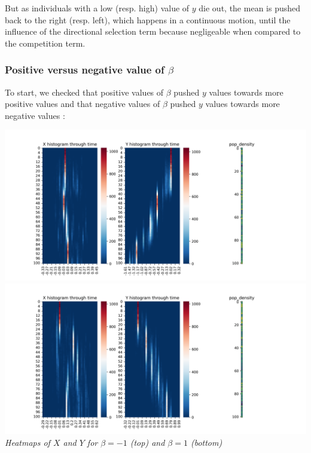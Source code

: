 \documentclass{article}
\begin{document}
But as individuals with a low (resp. high) value of $y$ die out, the mean is pushed back to the right (resp. left), which happens in a continuous motion, until the influence of the directional selection term because negligeable when compared to the competition term. \\
\vspace{5mm}

\subsubsection{Positive versus negative value of $\beta$}

To start, we checked that positive values of $\beta$ pushed $y$ values towards more positive values and that negative values of $\beta$ pushed $y$ values towards more negative values : \\

\begin{center}
\includegraphics[scale=0.37]{beta=-1} 
\includegraphics[scale=0.37]{beta=1} \\
\textit{Heatmaps of $X$ and $Y$ for $\beta = -1$ (top) and $\beta = 1$ (bottom)}
\end{center}
\vspace{5mm}
\end{document}
